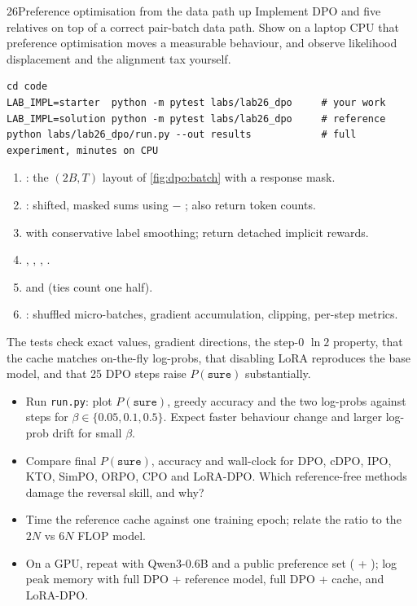 \begin{labbox}{26}{Preference optimisation from the data path up}
Implement DPO and five relatives on top of a correct pair-batch data path. Show on a laptop CPU
that preference optimisation moves a measurable behaviour, and observe likelihood displacement and
the alignment tax yourself.

\begin{lstlisting}[style=shell]
cd code
LAB_IMPL=starter  python -m pytest labs/lab26_dpo     # your work
LAB_IMPL=solution python -m pytest labs/lab26_dpo     # reference
python labs/lab26_dpo/run.py --out results            # full experiment, minutes on CPU
\end{lstlisting}

\begin{enumerate}
\item {}: the $(2B,T)$ layout of \cref{fig:dpo:batch} with a response mask.
\item {}: shifted, masked sums using  $-$ ; also return
  token counts.
\item {} with conservative label smoothing; return detached implicit rewards.
\item {}, , , .
\item {} and  (ties count one half).
\item {}: shuffled micro-batches, gradient accumulation, clipping, per-step metrics.
\end{enumerate}
The tests check exact values, gradient directions, the step-0 $\ln 2$ property, that the cache
matches on-the-fly log-probs, that disabling LoRA reproduces the base model, and that 25 DPO
steps raise $P(\texttt{sure})$ substantially.

\begin{itemize}
\item Run \texttt{run.py}: plot $P(\texttt{sure})$, greedy accuracy and the two log-probs against steps
  for $\beta\in\{0.05,0.1,0.5\}$. Expect faster behaviour change and larger log-prob drift for
  small $\beta$.
\item Compare final $P(\texttt{sure})$, accuracy and wall-clock for DPO, cDPO, IPO, KTO, SimPO, ORPO,
  CPO and LoRA-DPO. Which reference-free methods damage the reversal skill, and why?
\item Time the reference cache against one training epoch; relate the ratio to the $2N$ vs $6N$
  FLOP model.
\item On a GPU, repeat with Qwen3-0.6B and a public preference set (
  + ); log peak memory with full DPO + reference model, full DPO + cache, and
  LoRA-DPO.
\end{itemize}


\end{labbox}

